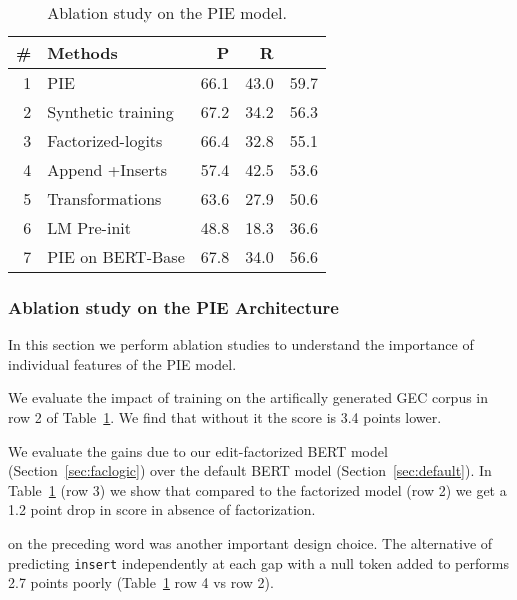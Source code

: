 \documentclass[11pt,a4paper]{article}
\begin{document}
\setlength\tabcolsep{5.0pt}
\begin{table}[h]
    \centering
    \begin{tabular}{|r|l|r|r|r|} \hline
        \# & Methods & P & R &  \\ \hline
        1& PIE   & 66.1 & 43.0 &  59.7 \\
        2&\hspace{0.5mm} Synthetic training & 67.2 & 34.2 & 56.3 \\
        3&\hspace{2.5mm}Factorized-logits & 66.4 & 32.8 & 55.1  \\ 
        4&\hspace{2.5mm}Append +Inserts & 57.4 & 42.5 & 53.6  \\
        5&\hspace{2.5mm}Transformations & 63.6 & 27.9 & 50.6  \\
        6&\hspace{2.5mm}LM Pre-init & 48.8 & 18.3  & 36.6 \\ 
      \hline
      7 & PIE on BERT-Base & 67.8 & 34.0  & 56.6  \\ \hline
    \end{tabular}
    \caption{Ablation study on the PIE model.}
    \label{tab:ablation}
\end{table}{}
\subsubsection{Ablation study on the PIE Architecture}
\label{sec:ablation}

In this section we perform ablation studies to understand the importance of individual features of the PIE model.

We evaluate the impact of training on the artifically generated GEC corpus in row 2 of Table~\ref{tab:ablation}. We find that without it the  score is 3.4 points lower.

We evaluate the gains due to our edit-factorized BERT model (Section~\ref{sec:faclogic}) over the default BERT model (Section~\ref{sec:default}).
In Table~\ref{tab:ablation} (row 3) we show that compared to the factorized model (row 2) we get a 1.2 point drop in  score in absence of factorization.

on the preceding word was another important design choice. 
The alternative of predicting {\tt insert} independently at each gap with a null token added to  performs
2.7  points poorly
(Table~\ref{tab:ablation} row 4 vs row 2).
\end{document}
